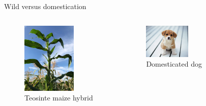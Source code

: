 \documentclass[11pt,ignorenonframetext,aspectratio=169]{beamer}
\begin{document}
\begin{frame}{Wild versus domestication}
\protect\hypertarget{wild-versus-domestication}{}
\begin{columns}[T,onlytextwidth]

\begin{figure}

{\centering \includegraphics[width=0.7\textwidth, keepaspectratio,height=0.8\textheight]{./images/Teosinte_maize_hybrid_cross} 

}

\caption{Teosinte maize hybrid}\label{fig:unnamed-chunk-1}
\end{figure}


\begin{figure}
\includegraphics[width=0.45\textwidth, keepaspectratio]{./images/domestic_dog_puppy} \caption{Domesticated dog}\label{fig:domesticated}
\end{figure}



\end{columns}
\end{frame}
\end{document}
